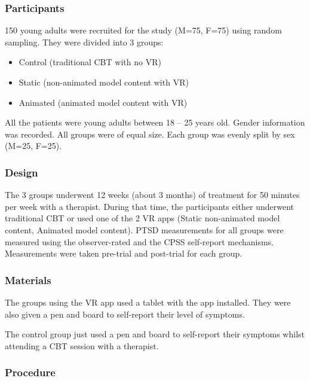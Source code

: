 \documentclass[
]{article}
\begin{document}
\hypertarget{participants}{%
\subsubsection{\texorpdfstring{\textbf{Participants}}{Participants}}\label{participants}}

150 young adults were recruited for the study (M=75, F=75) using random
sampling. They were divided into 3 groups:

\begin{itemize}
\item
  Control (traditional CBT with no VR)
\item
  Static (non-animated model content with VR)
\item
  Animated (animated model content with VR)
\end{itemize}

All the patients were young adults between 18 -- 25 years old. Gender
information was recorded. All groups were of equal size. Each group was
evenly split by sex (M=25, F=25).

\hypertarget{design}{%
\subsubsection{\texorpdfstring{\textbf{Design}}{Design}}\label{design}}

The 3 groups underwent 12 weeks (about 3 months) of treatment for 50
minutes per week with a therapist. During that time, the participants
either underwent traditional CBT or used one of the 2 VR apps (Static
non-animated model content, Animated model content). PTSD measurements
for all groups were measured using the observer-rated and the CPSS
self-report mechanisms. Measurements were taken pre-trial and post-trial
for each group.

\hypertarget{materials}{%
\subsubsection{\texorpdfstring{\textbf{Materials}}{Materials}}\label{materials}}

The groups using the VR app used a tablet with the app installed. They
were also given a pen and board to self-report their level of symptoms.

The control group just used a pen and board to self-report their
symptoms whilst attending a CBT session with a therapist.

\hypertarget{procedure}{%
\subsubsection{\texorpdfstring{\textbf{Procedure}}{Procedure}}\label{procedure}}
\end{document}
